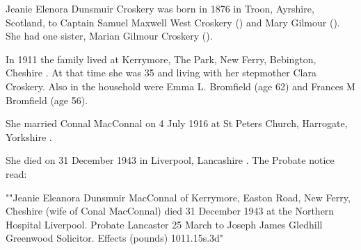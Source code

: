 
Jeanie Elenora Dunsmuir Croskery was born in 1876 in Troon, Ayrshire, Scotland, to Captain Samuel Maxwell West Croskery () and Mary Gilmour (). She had one sister, Marian Gilmour Croskery ().

In 1911 the family lived at Kerrymore, The Park, New Ferry, Bebington, Cheshire \cite{JCroskeryResidence1}. At that time she was 35 and living with her stepmother Clara Croskery.  Also in the household were Emma L. Bromfield (age 62) and Frances M Bromfield (age 56). 

She married Connal MacConnal on 4 July 1916 at St Peters Church, Harrogate, Yorkshire \cite{JCroskeryMarriage}.

She died on 31 December 1943 in	Liverpool, Lancashire \cite{JCroskeryDeath}.  The Probate notice read:

""Jeanie Eleanora Dunsmuir MacConnal of Kerrymore, Easton Road, New Ferry, Cheshire (wife of Conal MacConnal) died 31 December 1943 at the Northern Hospital Liverpool. Probate Lancaster 25 March to Joseph James Gledhill Greenwood Solicitor. Effects (pounds) 1011.15s.3d" 


